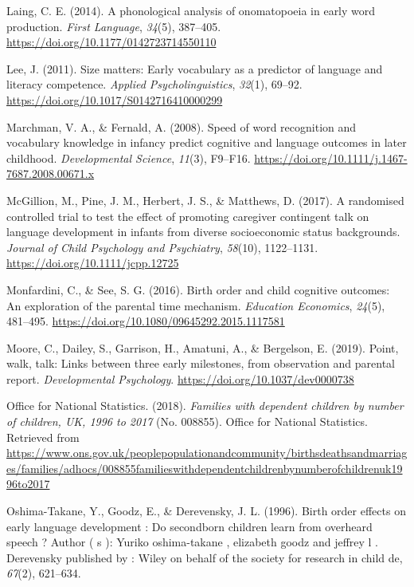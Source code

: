 \documentclass[
  english,
  man,floatsintext]{apa6}
\begin{document}
\leavevmode\hypertarget{ref-laing_phonological_2014}{}%
Laing, C. E. (2014). A phonological analysis of onomatopoeia in early word production. \emph{First Language}, \emph{34}(5), 387--405. \url{https://doi.org/10.1177/0142723714550110}

\leavevmode\hypertarget{ref-lee_size_2011}{}%
Lee, J. (2011). Size matters: Early vocabulary as a predictor of language and literacy competence. \emph{Applied Psycholinguistics}, \emph{32}(1), 69--92. \url{https://doi.org/10.1017/S0142716410000299}

\leavevmode\hypertarget{ref-marchman_speed_2008}{}%
Marchman, V. A., \& Fernald, A. (2008). Speed of word recognition and vocabulary knowledge in infancy predict cognitive and language outcomes in later childhood. \emph{Developmental Science}, \emph{11}(3), F9--F16. \url{https://doi.org/10.1111/j.1467-7687.2008.00671.x}

\leavevmode\hypertarget{ref-mcgillion_randomised_2017}{}%
McGillion, M., Pine, J. M., Herbert, J. S., \& Matthews, D. (2017). A randomised controlled trial to test the effect of promoting caregiver contingent talk on language development in infants from diverse socioeconomic status backgrounds. \emph{Journal of Child Psychology and Psychiatry}, \emph{58}(10), 1122--1131. \url{https://doi.org/10.1111/jcpp.12725}

\leavevmode\hypertarget{ref-monfardini_birth_2016}{}%
Monfardini, C., \& See, S. G. (2016). Birth order and child cognitive outcomes: An exploration of the parental time mechanism. \emph{Education Economics}, \emph{24}(5), 481--495. \url{https://doi.org/10.1080/09645292.2015.1117581}

\leavevmode\hypertarget{ref-moore_point_2019}{}%
Moore, C., Dailey, S., Garrison, H., Amatuni, A., \& Bergelson, E. (2019). Point, walk, talk: Links between three early milestones, from observation and parental report. \emph{Developmental Psychology}. \url{https://doi.org/10.1037/dev0000738}

\leavevmode\hypertarget{ref-office_for_national_statistics_families_2018}{}%
Office for National Statistics. (2018). \emph{Families with dependent children by number of children, UK, 1996 to 2017} (No. 008855). Office for National Statistics. Retrieved from \url{https://www.ons.gov.uk/peoplepopulationandcommunity/birthsdeathsandmarriages/families/adhocs/008855familieswithdependentchildrenbynumberofchildrenuk1996to2017}

\leavevmode\hypertarget{ref-oshima-takane_birth_1996}{}%
Oshima-Takane, Y., Goodz, E., \& Derevensky, J. L. (1996). Birth order effects on early language development : Do secondborn children learn from overheard speech ? Author ( s ): Yuriko oshima-takane , elizabeth goodz and jeffrey l . Derevensky published by : Wiley on behalf of the society for research in child de, \emph{67}(2), 621--634.
\end{document}
